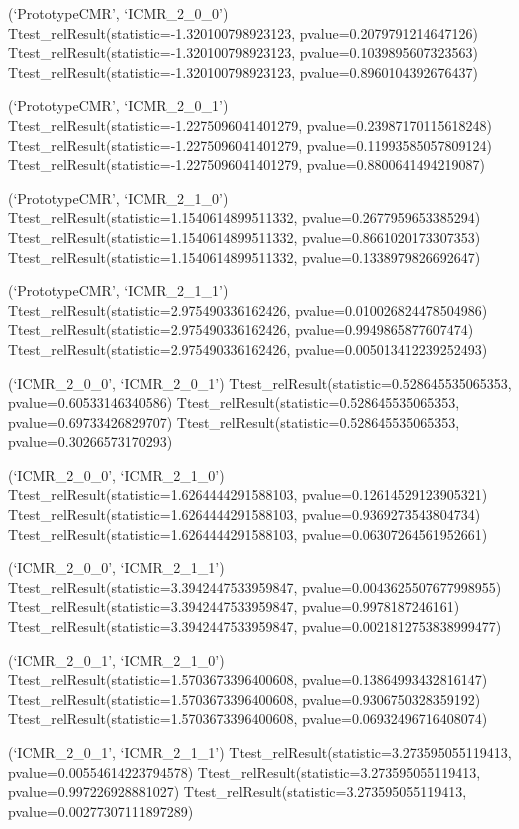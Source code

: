 \documentclass[
  letterpaper,
  DIV=11,
  numbers=noendperiod]{scrreport}
\begin{document}
(`PrototypeCMR', `ICMR\_2\_0\_0')
Ttest\_relResult(statistic=-1.320100798923123,
pvalue=0.2079791214647126)
Ttest\_relResult(statistic=-1.320100798923123,
pvalue=0.1039895607323563)
Ttest\_relResult(statistic=-1.320100798923123,
pvalue=0.8960104392676437)

(`PrototypeCMR', `ICMR\_2\_0\_1')
Ttest\_relResult(statistic=-1.2275096041401279,
pvalue=0.23987170115618248)
Ttest\_relResult(statistic=-1.2275096041401279,
pvalue=0.11993585057809124)
Ttest\_relResult(statistic=-1.2275096041401279,
pvalue=0.8800641494219087)

(`PrototypeCMR', `ICMR\_2\_1\_0')
Ttest\_relResult(statistic=1.1540614899511332,
pvalue=0.2677959653385294)
Ttest\_relResult(statistic=1.1540614899511332,
pvalue=0.8661020173307353)
Ttest\_relResult(statistic=1.1540614899511332,
pvalue=0.1338979826692647)

(`PrototypeCMR', `ICMR\_2\_1\_1')
Ttest\_relResult(statistic=2.975490336162426,
pvalue=0.010026824478504986)
Ttest\_relResult(statistic=2.975490336162426, pvalue=0.9949865877607474)
Ttest\_relResult(statistic=2.975490336162426,
pvalue=0.005013412239252493)

(`ICMR\_2\_0\_0', `ICMR\_2\_0\_1')
Ttest\_relResult(statistic=0.528645535065353, pvalue=0.60533146340586)
Ttest\_relResult(statistic=0.528645535065353, pvalue=0.69733426829707)
Ttest\_relResult(statistic=0.528645535065353, pvalue=0.30266573170293)

(`ICMR\_2\_0\_0', `ICMR\_2\_1\_0')
Ttest\_relResult(statistic=1.6264444291588103,
pvalue=0.12614529123905321)
Ttest\_relResult(statistic=1.6264444291588103,
pvalue=0.9369273543804734)
Ttest\_relResult(statistic=1.6264444291588103,
pvalue=0.06307264561952661)

(`ICMR\_2\_0\_0', `ICMR\_2\_1\_1')
Ttest\_relResult(statistic=3.3942447533959847,
pvalue=0.0043625507677998955)
Ttest\_relResult(statistic=3.3942447533959847, pvalue=0.9978187246161)
Ttest\_relResult(statistic=3.3942447533959847,
pvalue=0.0021812753838999477)

(`ICMR\_2\_0\_1', `ICMR\_2\_1\_0')
Ttest\_relResult(statistic=1.5703673396400608,
pvalue=0.13864993432816147)
Ttest\_relResult(statistic=1.5703673396400608,
pvalue=0.9306750328359192)
Ttest\_relResult(statistic=1.5703673396400608,
pvalue=0.06932496716408074)

(`ICMR\_2\_0\_1', `ICMR\_2\_1\_1')
Ttest\_relResult(statistic=3.273595055119413,
pvalue=0.00554614223794578)
Ttest\_relResult(statistic=3.273595055119413, pvalue=0.997226928881027)
Ttest\_relResult(statistic=3.273595055119413,
pvalue=0.00277307111897289)
\end{document}
